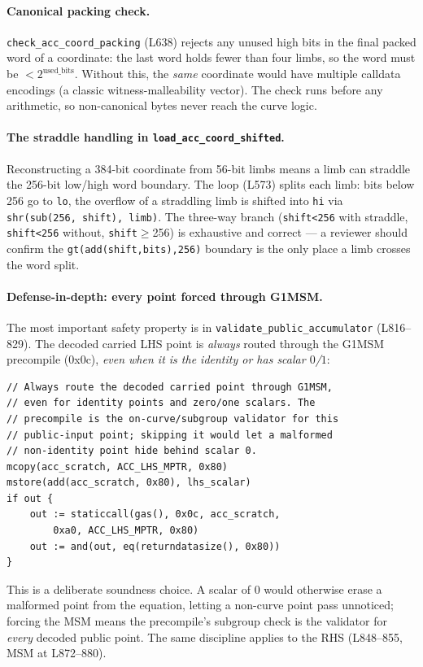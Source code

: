 \paragraph{Canonical packing check.}
\texttt{check\_\allowbreak{}acc\_\allowbreak{}coord\_\allowbreak{}packing} (L638) rejects any unused high
bits in the final packed word of a coordinate: the last word holds
fewer than four limbs, so the word must be
$< 2^{\text{used\_bits}}$. Without this, the \emph{same}
coordinate would have multiple calldata encodings (a classic
witness-malleability vector). The check runs before any arithmetic,
so non-canonical bytes never reach the curve logic.

\paragraph{The straddle handling in \texttt{load\_\allowbreak{}acc\_\allowbreak{}coord\_\allowbreak{}shifted}.}
Reconstructing a 384-bit coordinate from 56-bit limbs means a limb
can straddle the 256-bit low/high word boundary. The loop (L573)
splits each limb: bits below 256 go to \texttt{lo}, the overflow
of a straddling limb is shifted into \texttt{hi} via
\texttt{shr(sub(256, shift), limb)}. The three-way branch
(\texttt{shift<256} with straddle, \texttt{shift<256} without,
\texttt{shift}$\ge$256) is exhaustive and correct --- a reviewer
should confirm the \texttt{gt(add(shift,bits),256)} boundary is
the only place a limb crosses the word split.

\paragraph{Defense-in-depth: every point forced through G1MSM.}
The most important safety property is in
\texttt{validate\_\allowbreak{}public\_\allowbreak{}accumulator} (L816--829). The decoded
carried LHS point is \emph{always} routed through the G1MSM
precompile (0x0c), \emph{even when it is the identity or has
scalar $0$/$1$}:
\begin{lstlisting}[style=yul]
// Always route the decoded carried point through G1MSM,
// even for identity points and zero/one scalars. The
// precompile is the on-curve/subgroup validator for this
// public-input point; skipping it would let a malformed
// non-identity point hide behind scalar 0.
mcopy(acc_scratch, ACC_LHS_MPTR, 0x80)
mstore(add(acc_scratch, 0x80), lhs_scalar)
if out {
    out := staticcall(gas(), 0x0c, acc_scratch,
        0xa0, ACC_LHS_MPTR, 0x80)
    out := and(out, eq(returndatasize(), 0x80))
}
\end{lstlisting}
This is a deliberate soundness choice. A scalar of $0$ would
otherwise erase a malformed point from the equation, letting a
non-curve point pass unnoticed; forcing the MSM means the
precompile's subgroup check is the validator for \emph{every}
decoded public point. The same discipline applies to the RHS
(L848--855, MSM at L872--880).

